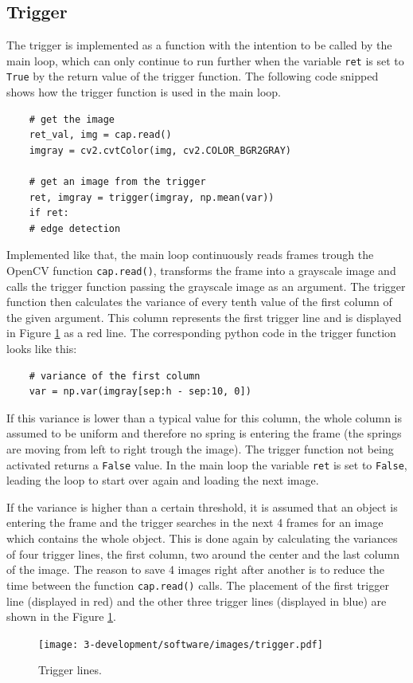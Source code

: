 \subsection{Trigger}
The trigger is implemented as a function with the intention to be called by the main loop, which can only continue to run further when the variable \texttt{ret} is set to \texttt{True} by the return value of the trigger function.
The following code snipped shows how the trigger function is used in the main loop.
\begin{lstlisting}
	# get the image
	ret_val, img = cap.read()
	imgray = cv2.cvtColor(img, cv2.COLOR_BGR2GRAY)
	
	# get an image from the trigger
	ret, imgray = trigger(imgray, np.mean(var))
	if ret:
	# edge detection
\end{lstlisting}
Implemented like that, the main loop continuously reads frames trough the OpenCV function \texttt{cap.read()}, transforms the frame into a grayscale image and calls the trigger function passing the grayscale image as an argument.
The trigger function then calculates the variance of every tenth value of the first column of the given argument. This column represents the first trigger line and is displayed in Figure \ref{development:trigger} as a red line. The corresponding python code in the trigger function looks like this:
\begin{lstlisting}
	# variance of the first column
	var = np.var(imgray[sep:h - sep:10, 0])
\end{lstlisting}
If this variance is lower than a typical value for this column, the whole column is assumed to be uniform and therefore no spring is entering the frame (the springs are moving from left to right trough the image). 
The trigger function not being activated returns a \texttt{False} value. In the main loop the variable \texttt{ret} is set to \texttt{False}, leading the loop to start over again and loading the next image.

If the variance is higher than a certain threshold, it is assumed that an object is entering the frame and the trigger searches in the next 4 frames for an image which contains the whole object.
This is done again by calculating the variances of four trigger lines, the first column, two around the center and the last column of the image. 
The reason to save 4 images right after another is to reduce the time between the function \texttt{cap.read()} calls. 
The placement of the first trigger line (displayed in red) and the other three trigger lines (displayed in blue) are shown in  the Figure \ref{development:trigger}.
\begin{figure}[ht]
	\centering
	\texttt{[image: 3-development/software/images/trigger.pdf]}
	\caption{Trigger lines.\label{development:trigger}}
\end{figure}

